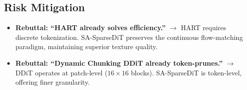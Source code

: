 \documentclass{article}
\begin{document}
\subsection{Risk Mitigation}
\begin{itemize}
    \item \textbf{Rebuttal: ``HART already solves efficiency.''}
          $\rightarrow$ HART requires discrete tokenization. SA-SparseDiT
          preserves the continuous flow-matching paradigm, maintaining superior
          texture quality.
    \item \textbf{Rebuttal: ``Dynamic Chunking DDiT already token-prunes.''}
          $\rightarrow$ DDiT operates at patch-level ($16\times16$ blocks).
          SA-SparseDiT is token-level, offering finer granularity.
\end{itemize}
\end{document}
